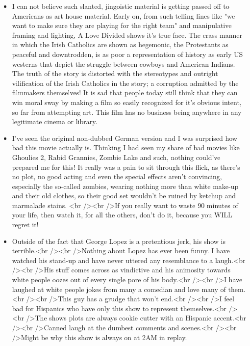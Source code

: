 \documentclass[10pt,a4paper]{article}
\begin{document}
\begin{itemize}
\item I can not believe such slanted, jingoistic material is getting passed off to Americans as art house material. Early on, from such telling lines like "we want to make sure they are playing for the right team" and manipulative framing and lighting, A Love Divided shows it's true face. The crass manner in which the Irish Catholics are shown as hegemonic, the Protestants as peaceful and downtrodden, is as poor a representation of history as early US westerns that depict the struggle between cowboys and American Indians. The truth of the story is distorted with the stereotypes and outright vilification of the Irish Catholics in the story; a corruption admitted by the filmmakers themselves! It is sad that people today still think that they can win moral sway by making a film so easily recognized for it's obvious intent, so far from attempting art. This film has no business being anywhere in any legitimate cinema or library.
\item I've seen the original non-dubbed German version and I was surprised how bad this movie actually is. Thinking I had seen my share of bad movies like Ghoulies 2, Rabid Grannies, Zombie Lake and such, nothing could've prepared me for this! It really was a pain to sit through this flick, as there's no plot, no good acting and even the special effects aren't convincing, especially the so-called zombies, wearing nothing more than white make-up and their old clothes, so their good set wouldn't be ruined by ketchup and marmalade stains. <br /><br />If you really want to waste 90 minutes of your life, then watch it, for all the others, don't do it, because you WILL regret it!
\item Outside of the fact that George Lopez is a pretentious jerk, his show is terrible.<br /><br />Nothing about Lopez has ever been funny. I have watched his stand-up and have never uttered any resemblance to a laugh.<br /><br />His stuff comes across as vindictive and his animosity towards white people oozes out of every single pore of his body.<br /><br />I have laughed at white people jokes from many a comedian and love many of them.<br /><br />This guy has a grudge that won't end.<br /><br />I feel bad for Hispanics who have only this show to represent themselves.<br /><br />The shows plots are always cookie cutter with an Hispanic accent.<br /><br />Canned laugh at the dumbest comments and scenes.<br /><br />Might be why this show is always on at 2AM in replay.	
\end{itemize}
\end{document}

